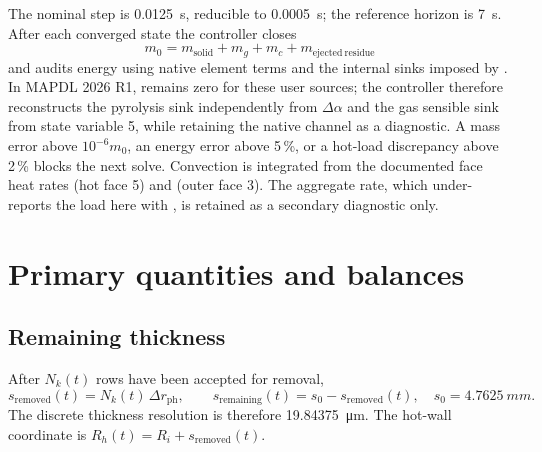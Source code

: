 \documentclass[oneside,openany]{amsdtx}
\begin{document}
The nominal step is \SI{0.0125}{s}, reducible to \SI{0.0005}{s}; the reference
horizon is \SI{7}{s}. After each converged state the controller closes
\begin{equation}
 m_0=m_{\mathrm{solid}}+m_g+m_c+m_{\mathrm{ejected\ residue}}
\end{equation}
and audits energy using native element terms and the internal sinks imposed by
. In MAPDL 2026 R1,  remains zero for
these user sources; the controller therefore reconstructs the pyrolysis sink
independently from \(\Delta\alpha\) and the gas sensible sink from state
variable 5, while retaining the native channel as a diagnostic. A mass error
above \(10^{-6}m_0\), an energy error above 5\,\%, or a hot-load discrepancy
above 2\,\% blocks the next solve.
Convection is integrated from the documented face heat rates
 (hot face 5) and  (outer face 3). The aggregate
 rate, which under-reports the load here with ,
is retained as a secondary diagnostic only.

\begin{center}\end{center}

\section{Primary quantities and balances}
\subsection{Remaining thickness}
After \(N_k(t)\) rows have been accepted for removal,
\[
s_{\mathrm{removed}}(t)=N_k(t)\,\Delta r_{\mathrm{ph}},\qquad
s_{\mathrm{remaining}}(t)=s_0-s_{\mathrm{removed}}(t),
\quad s_0=\SI{4.7625}{mm}.
\]
The discrete thickness resolution is therefore \SI{19.84375}{\micro m}. The
hot-wall coordinate is \(R_h(t)=R_i+s_{\mathrm{removed}}(t)\).
\end{document}
